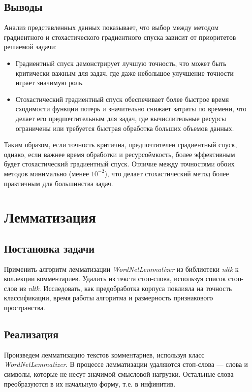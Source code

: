 \documentclass[14pt]{extarticle}
\begin{document}
\subsection{Выводы}

Анализ представленных данных показывает, что выбор между методом градиентного и стохастического градиентного спуска зависит от приоритетов решаемой задачи:

\begin{itemize}
    \item Градиентный спуск демонстрирует лучшую точность, что может быть критически важным для задач, где даже небольшое улучшение точности играет значимую роль.
    \item Стохастический градиентный спуск обеспечивает более быстрое время сходимости функции потерь и значительно снижает затраты по времени, что делает его предпочтительным для задач, где вычислительные ресурсы ограничены или требуется быстрая обработка больших объемов данных.
\end{itemize}

Таким образом, если точность критична, предпочтителен градиентный спуск, однако, если важнее время обработки и ресурсоёмкость, более эффективным будет стохастический градиентный спуск. Отличие между точностями обоих методов минимально (менее \(10^{-2}\)), что делает стохастический метод более практичным для большинства задач.

\section{Лемматизация}

\subsection{Постановка задачи}

Применить алгоритм лемматизации \textit{WordNetLemmatizer} из библиотеки \textit{nltk} к коллекции комментариев. Удалить из текста стоп-слова, используя список стоп-слов из \textit{nltk}. Исследовать, как предобработка корпуса повлияла на точность классификации, время работы алгоритма и размерность признакового пространства.

\subsection{Реализация}
Произведем лемматизацию текстов комментариев, используя класс \\ \textit{WordNetLemmatizer}. В процессе лемматизации удаляются стоп-слова — слова и символы, которые не несут значимой смысловой нагрузки. Остальные слова преобразуются в их начальную форму, т.е. в инфинитив.
\end{document}
